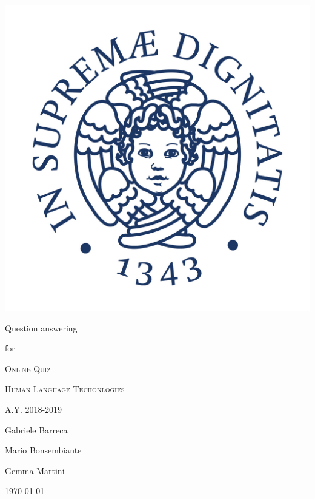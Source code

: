 \documentclass[12pt,a4paper,hidelinks]{article}
\begin{document}
\begin{titlepage}

\begin{center}
\vspace{3.5cm}

\Large

  \includegraphics[scale=0.3]{pics/Cherubino.jpg}

  \vspace{1.2cm}

  {\color{pblue} \sc \huge Question answering}
  
  \vspace{0.3cm}

  {\color{pblue} \sc for}

  \vspace{0.3cm}
  
  {\color{pblue} \textsc{ \huge Online Quiz}}

  \vspace{1.5cm}  

  {\color{pblue} \textsc{ \Large Human Language Techonlogies}}

  \vspace{0.5cm}

  {\color{pblue} \textsc{ A.Y. 2018-2019}}

  \vspace{2cm}

{\sc Gabriele Barreca}    
   \vspace{0.5cm}
  
{\sc Mario Bonsembiante}
    \vspace{0.5cm}
 
{\sc Gemma Martini}
  
  \vspace{1.5cm}

{\large \today}
\vfill
\end{center}
\end{titlepage}
\end{document}
